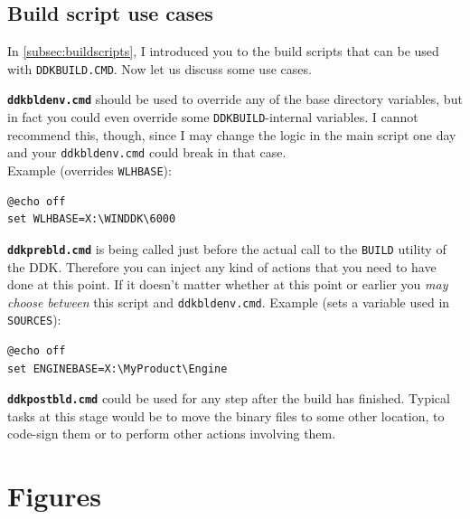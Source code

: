 \documentclass[a4paper,titlepage]{report}
\begin{document}
\section{Build script use cases}
In \autoref{subsec:buildscripts}, I introduced you to the build scripts that can be used with
\texttt{DDKBUILD.CMD}. Now let us discuss some use cases.

\textbf{\texttt{ddkbldenv.cmd}} should be used to override any of the base directory variables, but
in fact you could even override some \texttt{DDKBUILD}-internal variables. I cannot recommend
this, though, since I may change the logic in the main script one day and your \texttt{ddkbldenv.cmd}
could break in that case.\\

Example (overrides \texttt{WLHBASE}):

\begin{verbatim}
@echo off
set WLHBASE=X:\WINDDK\6000
\end{verbatim}

\textbf{\texttt{ddkprebld.cmd}} is being called just before the actual call to the \texttt{BUILD}
utility of the DDK. Therefore you can inject any kind of actions that you need to have done at this
point. If it doesn't matter whether at this point or earlier you \emph{may choose between} this script
and \texttt{ddkbldenv.cmd}. Example (sets a variable used in \texttt{SOURCES}):

\begin{verbatim}
@echo off
set ENGINEBASE=X:\MyProduct\Engine
\end{verbatim}

\textbf{\texttt{ddkpostbld.cmd}} could be used for any step after the build has finished. Typical
tasks at this stage would be to move the binary files to some other location, to code-sign
them or to perform other actions involving them.

\chapter{Figures}\thispagestyle{fancy}
\end{document}
